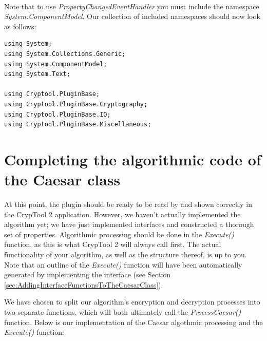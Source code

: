 \ \\
\indent Note that to use \textit{PropertyChangedEventHandler} you must include the namespace \textit{System.\linebreak ComponentModel}. Our collection of included namespaces should now look as follows:

\begin{lstlisting}
using System;
using System.Collections.Generic;
using System.ComponentModel;
using System.Text;

using Cryptool.PluginBase;
using Cryptool.PluginBase.Cryptography;
using Cryptool.PluginBase.IO;
using Cryptool.PluginBase.Miscellaneous;
\end{lstlisting}
\clearpage

\section{Completing the algorithmic code of the Caesar class}
\label{sec:CompletingTheAlgorithmicCodeOfTheCaesarClass}

At this point, the plugin should be ready to be read by and shown correctly in the CrypTool 2 application. However, we haven't actually implemented the algorithm yet; we have just implemented interfaces and constructed a thorough set of properties. Algorithmic processing should be done in the \textit{Execute()} function, as this is what CrypTool 2 will always call first. The actual functionality of your algorithm, as well as the structure thereof, is up to you. Note that an outline of the \textit{Execute()} function will have been automatically generated by implementing the interface (see Section \ref{sec:AddingInterfaceFunctionsToTheCaesarClass}).

We have chosen to split our algorithm's encryption and decryption processes into two separate functions, which will both ultimately call the \textit{ProcessCaesar()} function. Below is our implementation of the Caesar algothmic processing and the \textit{Execute()} function:

